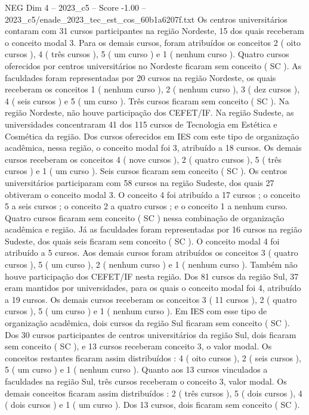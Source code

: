 \begin{textsample}{NEG Dim 4 – 2023\_c5 – Score -1.00 – 2023\_c5/enade\_2023\_tec\_est\_cos\_60b1a6207f.txt}
Os centros universitários contaram com 31 cursos participantes na região Nordeste, 15 dos quais receberam o conceito modal 3.
Para os demais cursos, foram atribuídos os conceitos 2 ( oito cursos ), 4 ( três cursos ), 5 ( um curso ) e 1 ( nenhum curso ).
Quatro cursos oferecidos por centros universitários no Nordeste ficaram sem conceito ( SC ).
As faculdades foram representadas por 20 cursos na região Nordeste, os quais receberam os conceitos 1 ( nenhum curso ), 2 ( nenhum curso ), 3 ( dez cursos ), 4 ( seis cursos ) e 5 ( um curso ).
Três cursos ficaram sem conceito ( SC ).
Na região Nordeste, não houve participação dos CEFET/IF.
Na região Sudeste, as universidades concentraram 41 dos 115 cursos de Tecnologia em Estética e Cosmética da região.
Dos cursos oferecidos em IES com este tipo de organização acadêmica, nessa região, o conceito modal foi 3, atribuído a 18 cursos.
Os demais cursos receberam os conceitos 4 ( nove cursos ), 2 ( quatro cursos ), 5 ( três cursos ) e 1 ( um curso ).
Seis cursos ficaram sem conceito ( SC ).
Os centros universitários participaram com 58 cursos na região Sudeste, dos quais 27 obtiveram o conceito modal 3.
O conceito 4 foi atribuído a 17 cursos ; o conceito 5 a seis cursos ; o conceito 2 a quatro cursos ; e o conceito 1 a nenhum curso.
Quatro cursos ficaram sem conceito ( SC ) nessa combinação de organização acadêmica e região.
Já as faculdades foram representadas por 16 cursos na região Sudeste, dos quais seis ficaram sem conceito ( SC ).
O conceito modal 4 foi atribuído a 5 cursos.
Aos demais cursos foram atribuídos os conceitos 3 ( quatro cursos ), 5 ( um curso ), 2 ( nenhum curso ) e 1 ( nenhum curso ).
Também não houve participação dos CEFET/IF nesta região.
Dos 81 cursos da região Sul, 37 eram mantidos por universidades, para os quais o conceito modal foi 4, atribuído a 19 cursos.
Os demais cursos receberam os conceitos 3 ( 11 cursos ), 2 ( quatro cursos ), 5 ( um curso ) e 1 ( nenhum curso ).
Em IES com esse tipo de organização acadêmica, dois cursos da região Sul ficaram sem conceito ( SC ).
Dos 30 cursos participantes de centros universitários da região Sul, dois ficaram sem conceito ( SC ), e 13 cursos receberam conceito 3, o valor modal.
Os conceitos restantes ficaram assim distribuídos : 4 ( oito cursos ), 2 ( seis cursos ), 5 ( um curso ) e 1 ( nenhum curso ).
Quanto aos 13 cursos vinculados a faculdades na região Sul, três cursos receberam o conceito 3, valor modal.
Os demais conceitos ficaram assim distribuídos : 2 ( três cursos ), 5 ( dois cursos ), 4 ( dois cursos ) e 1 ( um curso ).
Dos 13 cursos, dois ficaram sem conceito ( SC ).

\end{textsample}

